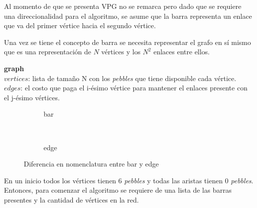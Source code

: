 Al momento de que se presenta VPG no se remarca pero dado que se requiere una direccionalidad para el algoritmo, se asume que la barra representa un enlace que va del primer vértice hacia el segundo vértice.

Una vez se tiene el concepto de barra se necesita representar el grafo en sí mismo que es una representación de $N$ vértices y los $N^2$ enlaces entre ellos.

\begin{framed}
		\noindent \textbf{graph}\\
		$vertices$: lista de tamaño N con los \emph{pebbles} que tiene disponible cada vértice.\\ 
		$edges$: el costo que paga el i-ésimo vértice para mantener el enlaces presente con el j-ésimo vértices.
\end{framed}

\begin{figure}
\centering
\begin{subfigure}[b]{0.25\textwidth}
\caption{bar}
\end{subfigure}
\,
\begin{subfigure}[b]{0.25\textwidth}
\caption{edge}
\end{subfigure}

\caption{Diferencia en nomenclatura entre bar y edge}
\label{fig:nomenclatura}
\end{figure}

En un inicio todos los vértices tienen 6 \emph{pebbles} y todas las aristas tienen 0 \emph{pebbles}.  Entonces, para comenzar el algoritmo se requiere de una lista de las barras presentes y la cantidad de vértices 	en la red.

